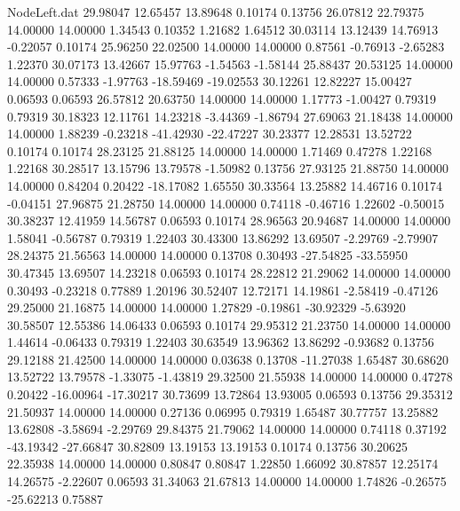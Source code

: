 \begin{filecontents}{NodeLeft.dat}
  29.98047   12.65457   13.89648     0.10174    0.13756   26.07812   22.79375   14.00000   14.00000    1.34543    0.10352    1.21682    1.64512
  30.03114   13.12439   14.76913    -0.22057    0.10174   25.96250   22.02500   14.00000   14.00000    0.87561   -0.76913   -2.65283    1.22370
  30.07173   13.42667   15.97763    -1.54563   -1.58144   25.88437   20.53125   14.00000   14.00000    0.57333   -1.97763  -18.59469  -19.02553
  30.12261   12.82227   15.00427     0.06593    0.06593   26.57812   20.63750   14.00000   14.00000    1.17773   -1.00427    0.79319    0.79319
  30.18323   12.11761   14.23218    -3.44369   -1.86794   27.69063   21.18438   14.00000   14.00000    1.88239   -0.23218  -41.42930  -22.47227
  30.23377   12.28531   13.52722     0.10174    0.10174   28.23125   21.88125   14.00000   14.00000    1.71469    0.47278    1.22168    1.22168
  30.28517   13.15796   13.79578    -1.50982    0.13756   27.93125   21.88750   14.00000   14.00000    0.84204    0.20422  -18.17082    1.65550
  30.33564   13.25882   14.46716     0.10174   -0.04151   27.96875   21.28750   14.00000   14.00000    0.74118   -0.46716    1.22602   -0.50015
  30.38237   12.41959   14.56787     0.06593    0.10174   28.96563   20.94687   14.00000   14.00000    1.58041   -0.56787    0.79319    1.22403
  30.43300   13.86292   13.69507    -2.29769   -2.79907   28.24375   21.56563   14.00000   14.00000    0.13708    0.30493  -27.54825  -33.55950
  30.47345   13.69507   14.23218     0.06593    0.10174   28.22812   21.29062   14.00000   14.00000    0.30493   -0.23218    0.77889    1.20196
  30.52407   12.72171   14.19861    -2.58419   -0.47126   29.25000   21.16875   14.00000   14.00000    1.27829   -0.19861  -30.92329   -5.63920
  30.58507   12.55386   14.06433     0.06593    0.10174   29.95312   21.23750   14.00000   14.00000    1.44614   -0.06433    0.79319    1.22403
  30.63549   13.96362   13.86292    -0.93682    0.13756   29.12188   21.42500   14.00000   14.00000    0.03638    0.13708  -11.27038    1.65487
  30.68620   13.52722   13.79578    -1.33075   -1.43819   29.32500   21.55938   14.00000   14.00000    0.47278    0.20422  -16.00964  -17.30217
  30.73699   13.72864   13.93005     0.06593    0.13756   29.35312   21.50937   14.00000   14.00000    0.27136    0.06995    0.79319    1.65487
  30.77757   13.25882   13.62808    -3.58694   -2.29769   29.84375   21.79062   14.00000   14.00000    0.74118    0.37192  -43.19342  -27.66847
  30.82809   13.19153   13.19153     0.10174    0.13756   30.20625   22.35938   14.00000   14.00000    0.80847    0.80847    1.22850    1.66092
  30.87857   12.25174   14.26575    -2.22607    0.06593   31.34063   21.67813   14.00000   14.00000    1.74826   -0.26575  -25.62213    0.75887

\end{filecontents}
